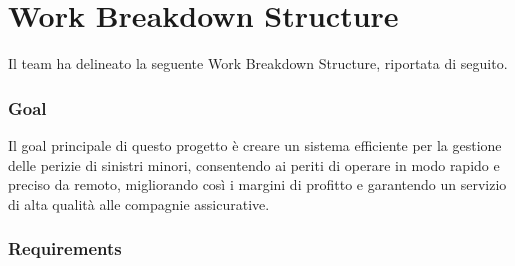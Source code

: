 \documentclass[a4paper,12pt, openright]{report}
\begin{document}
\section{Work Breakdown Structure}
Il team ha delineato la seguente Work Breakdown Structure, riportata di seguito.

\subsubsection{Goal}

Il goal principale di questo progetto è creare un sistema efficiente per la gestione delle perizie di sinistri minori, consentendo ai periti di operare in modo rapido e preciso da remoto, migliorando così i margini di profitto e garantendo un servizio di alta qualità alle compagnie assicurative.

\subsubsection{Requirements}
\end{document}
